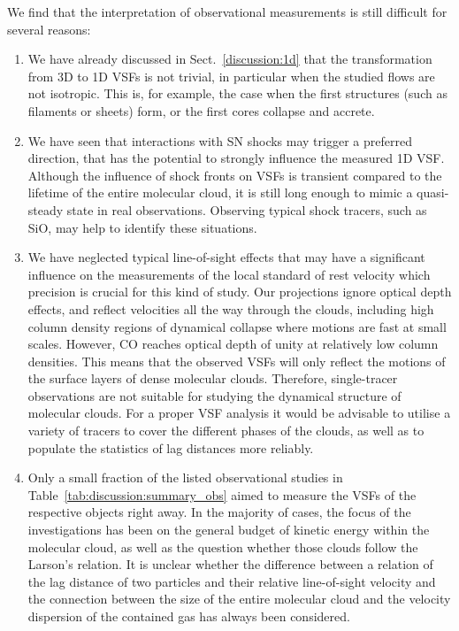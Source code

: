 \documentclass{aa}		%
\begin{document}
We find that the interpretation of observational measurements is still difficult for several reasons:
\begin{enumerate}
\item We have already discussed in Sect.~\ref{discussion:1d} that the transformation from 3D to 1D VSFs is not trivial, in particular when the studied flows are not isotropic.
This is, for example, the case when the first structures (such as filaments or sheets) form, or the first cores collapse and accrete.
\item We have seen that interactions with SN shocks may trigger a preferred direction, that has the potential to strongly influence the measured 1D VSF.
Although the influence of shock fronts on VSFs is transient compared to the lifetime of the entire molecular cloud, it is still long enough to mimic a quasi-steady state in real observations.
Observing typical shock tracers, such as SiO, may help to identify these situations. 
\item We have neglected typical line-of-sight effects that may have a significant influence on the measurements of the local standard of rest velocity which precision is crucial for this kind of study.
Our projections ignore optical depth effects, and reflect velocities all the way through the clouds, including high column density regions of dynamical collapse where motions are fast at small scales.  However, CO reaches optical depth of unity at relatively low column densities. This means that the observed VSFs will only reflect the motions of the surface layers of dense molecular clouds.  
Therefore, single-tracer observations are not suitable for studying the dynamical structure of molecular clouds. 
For a proper VSF analysis it would be advisable to utilise a variety of tracers to cover the different phases of the clouds, as well as to populate the statistics of lag distances more reliably.
\item Only a small fraction of the listed observational studies in Table~\ref{tab:discussion:summary_obs} aimed to measure the VSFs of the respective objects right away.
In the majority of cases, the focus of the investigations has been on the general budget of kinetic energy within the molecular cloud, as well as the question whether those clouds follow the Larson's relation.
It is unclear whether the difference between a relation of the lag distance of two particles and their relative line-of-sight velocity and the connection between the size of the entire molecular cloud and the velocity dispersion of the contained gas has always been considered.
\end{enumerate}
\end{document}
